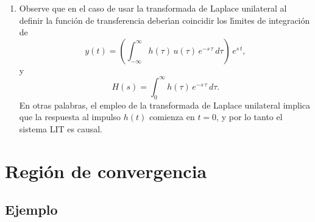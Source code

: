 \begin{enumerate}
\item Observe que en el caso de usar la transformada de Laplace unilateral al definir la funci\'{o}n
de transferencia deber\'{\i}an coincidir los l\'{\i}mites de integraci\'{o}n de
\begin{equation}
  y\left( t\right) =
  \left( \int_{-\infty}^{\infty }h\left( \tau\right) \, u\left( \tau\right) \, e^{-s \, \tau } \, d\tau \right) \, 
     e^{s \, t},
\end{equation}
y
\begin{equation}
        H\left( s\right) =
                \int_{0}^{\infty}h\left( \tau \right) \, e^{-s \, \tau} \, d\tau.
\end{equation}
En otras palabras, el empleo de la transformada de Laplace unilateral implica que la respuesta al impulso
$h(t)$ comienza en $t=0$, y por lo tanto el sistema LIT es causal.

\end{enumerate}

\section{Regi\'{o}n de convergencia}

\subsection{Ejemplo}

